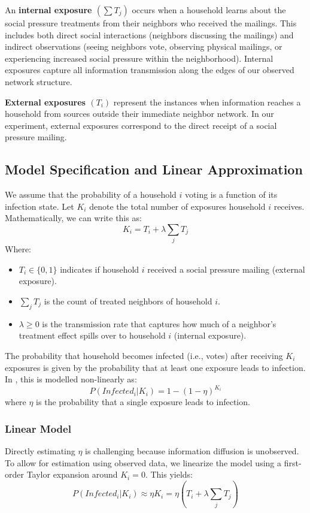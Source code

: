 \documentclass[11pt]{article}
\begin{document}
An \textbf{internal exposure $(\sum T_j)$} occurs when a household learns about the social pressure treatments from their neighbors who received the mailings. This includes both direct social interactions (neighbors discussing the mailings) and indirect observations (seeing neighbors vote, observing physical mailings, or experiencing increased social pressure within the neighborhood). Internal exposures capture all information transmission along the edges of our observed network structure.

\textbf{External exposures $(T_i)$} represent the instances when information reaches a household from sources outside their immediate neighbor network. In our experiment, external exposures correspond to the direct receipt of a social pressure mailing.

\subsection{Model Specification and Linear Approximation}
We assume that the probability of a household $i$ voting is a function of its infection state. Let $K_i$ denote the total number of exposures household $i$ receives. Mathematically, we can write this as:
\begin{equation*}
    K_i = T_i + \lambda \sum_{j} T_j
\end{equation*}
Where:
\begin{itemize}[noitemsep]
    \item $T_i \in \{0,1\}$ indicates if household $i$ received a social pressure mailing (external exposure).
    \item $\sum_{j} T_j$ is the count of treated neighbors of household $i$.
    \item $\lambda \geq 0$ is the transmission rate that captures how much of a neighbor's treatment effect spills over to household $i$ (internal exposure).
\end{itemize}

The probability that household becomes infected (i.e., votes) after receiving $K_i$ exposures is given by the probability that at least one exposure leads to infection. In \cite{myers_information_2012}, this is modelled non-linearly as:
\begin{equation*}
    P(Infected_i | K_i) = 1 - (1 - \eta)^{K_i}
\end{equation*}
where $\eta$ is the probability that a single exposure leads to infection.

\subsubsection{Linear Model}
Directly estimating $\eta$ is challenging because information diffusion is unobserved. To allow for estimation using observed data, we linearize the model using a first-order Taylor expansion around $K_i = 0$. This yields:
\begin{equation*}
    P(Infected_i | K_i) \approx \eta K_i = \eta (T_i + \lambda \sum_{j} T_j)
\end{equation*}
\end{document}
